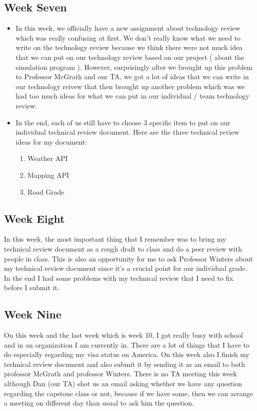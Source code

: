 \begin{singlespace}
\subsection{Week Seven}
\begin{itemize}
    \item In this week, we officially have a new assignment about technology review which was really confusing at first. We don't really know what we need to write on the technology review because we think there were not much idea that we can put on our technology review based on our project ( about the simulation program ). However, surprisingly after we brought up this problem to Professor McGrath and our TA, we got a lot of ideas that we can write in our technology reivew that then brought up another problem which was we had too much ideas for what we can put in our individual / team technology review. 
    \item In the end, each of us still have to choose 3 specific item to put on our individual technical review document. Here are the three technical review ideas for my document: 
        \begin{enumerate}
            \item Weather API 
            \item Mapping API
            \item Road Grade
        \end{enumerate}
\end{itemize}

\subsection{Week Eight}
In this week, the most important thing that I remember was to bring my technical review document as a rough draft to class and do a peer review with people in class. This is also an opportunity for me to ask Professor Winters about my technical review document since it's a crucial point for our individual grade. In the end I had some problems with my technical review that I need to fix before I submit it.

\subsection{Week Nine}
On this week and the last week which is week 10, I got really busy with school and in an organization I am currently in. There are a lot of things that I have to do especially regarding my visa status on America. On this week also I finish my technical review document and also submit it by sending it as an email to both professor McGrath and professor Winters. There is no TA meeting this week although Dan (our TA) shot us an email asking whether we have any question regarding the capstone class or not, because if we have some, then we can arrange a meeting on different day than usual to ask him the question. 


\end{singlespace}
